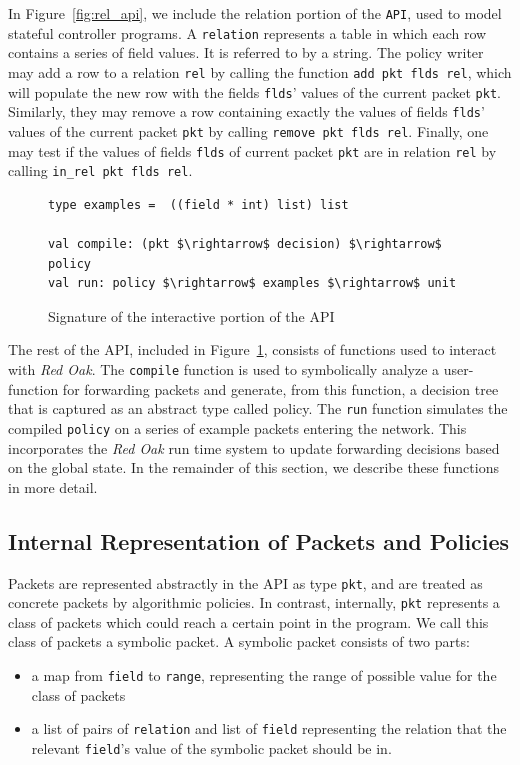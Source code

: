 \documentclass[nocopyrightspace]{sigplanconf}
\begin{document}
In Figure~\ref{fig:rel_api}, we include the relation portion of the \lstinline|API|, used to model stateful controller programs. A \lstinline|relation| represents a table in which each row contains a series of field values. It is referred to by a string. The policy writer may add a row to a relation \lstinline|rel| by calling the function \lstinline|add pkt flds rel|, which will populate the new row with the fields \lstinline|flds|' values of the current packet \lstinline|pkt|. Similarly, they may remove a row containing exactly the values of fields \lstinline|flds|' values of the current packet \lstinline|pkt| by calling \lstinline|remove pkt flds rel|. Finally, one may test if the values of fields \lstinline|flds| of current packet \lstinline|pkt| are in relation \lstinline|rel| by calling \lstinline|in_rel pkt flds rel|.


\begin{figure}[ht]
  \begin{lstlisting}[mathescape]
type examples =  ((field * int) list) list
  
val compile: (pkt $\rightarrow$ decision) $\rightarrow$ policy
val run: policy $\rightarrow$ examples $\rightarrow$ unit
  \end{lstlisting}

  \caption{Signature of the interactive portion of the API}
  \label{fig:build_api}
\end{figure}


The rest of the API, included in Figure~\ref{fig:build_api}, consists of functions used to interact with \textit{Red Oak}. The \lstinline|compile| function is used to symbolically analyze a user-function for forwarding packets and generate, from this function, a decision tree that is captured as an abstract type called policy. The \lstinline|run| function simulates the compiled \lstinline|policy| on a series of example packets entering the network. This incorporates the \textit{Red Oak} run time system to update forwarding decisions based on the global state. In the remainder of this section, we describe these functions in more detail.

\subsection*{Internal Representation of Packets and Policies}

Packets are represented abstractly in the API as type \lstinline|pkt|, and are treated as concrete packets by algorithmic policies. In contrast, internally, \lstinline|pkt| represents a class of packets which could reach a certain point in the program. We call this class of packets a symbolic packet.
A symbolic packet consists of two parts:
\begin{itemize}
\item a map from \lstinline|field| to \lstinline|range|, representing the range of possible value for the class of packets
  \item a list of pairs of \lstinline|relation| and list of \lstinline|field| representing the relation that the relevant \lstinline|field|'s value of the symbolic packet should be in. 
  \end{itemize}
  
\end{document}
